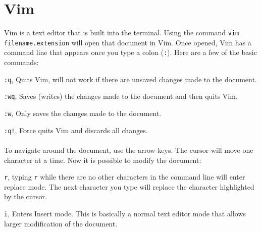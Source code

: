 \documentclass[10pt,a4paper]{report}
\begin{document}
\section*{Vim} 
Vim is a text editor that is built into the terminal. Using the command \verb|vim filename.extension| will open that document in Vim. Once opened, Vim has a command line that appears once you type a colon (\verb|:|). Here are a few of the basic commands:

\verb|:q|, Quits Vim, will not work if there are unsaved changes made to the document.

\verb|:wq|, Saves (writes) the changes made to the document and then quits Vim.

\verb|:w|, Only saves the changes made to the document.

\verb|:q!|, Force quits Vim and discards all changes.\\\\
To navigate around the document, use the arrow keys. The cursor will move one character at a time. Now it is possible to modify the document:

\verb|r|, typing \verb|r| while there are no other characters in the command line will enter replace mode. The next character you type will replace the character highlighted by the cursor.

\verb|i|, Enters Insert mode. This is basically a normal text editor mode that allows larger modification of the document.
\end{document}
